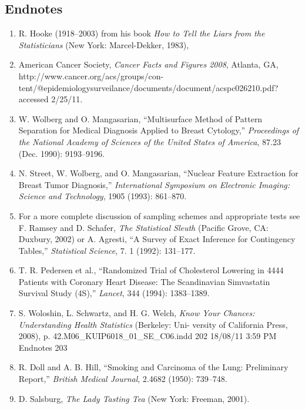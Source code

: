 \documentclass[
]{book}
\begin{document}
\begin{enumerate}
\end{enumerate}

\hypertarget{endnotes-3}{%
\subsection*{Endnotes}\label{endnotes-3}}

\begin{enumerate}

\item R. Hooke (1918–2003) from his book \textit{How to Tell the Liars from the Statisticians} (New York: Marcel-Dekker, 1983),
\item American Cancer Society, \textit{Cancer Facts and Figures 2008}, Atlanta, GA, http://www.cancer.org/acs/groups/con-
tent/@epidemiologysurveilance/documents/document/acspc026210.pdf? accessed 2/25/11.
\item W. Wolberg and O. Mangasarian, “Multisurface Method of Pattern Separation for Medical Diagnosis Applied to
Breast Cytology,” \textit{Proceedings of the National Academy of Sciences of the United States of America}, 87.23 (Dec.
1990): 9193–9196.
\item N. Street, W. Wolberg, and O. Mangasarian, “Nuclear Feature Extraction for Breast Tumor Diagnosis,” \textit{International
Symposium on Electronic Imaging: Science and Technology}, 1905 (1993): 861–870.
\item For a more complete discussion of sampling schemes and appropriate tests see F. Ramsey and D. Schafer, \textit{The
Statistical Sleuth} (Pacific Grove, CA: Duxbury, 2002) or A. Agresti, “A Survey of Exact Inference for Contingency
Tables,” \textit{Statistical Science}, 7. 1 (1992): 131–177.
\item T. R. Pedersen et al., “Randomized Trial of Cholesterol Lowering in 4444 Patients with Coronary Heart Disease:
The Scandinavian Simvastatin Survival Study (4S),” \textit{Lancet}, 344 (1994): 1383–1389.
\item S. Woloshin, L. Schwartz, and H. G. Welch, \textit{Know Your Chances: Understanding Health Statistics} (Berkeley: Uni-
versity of California Press, 2008), p. 42.M06\_KUIP6018\_01\_SE\_C06.indd 202 18/08/11 3:59 PM Endnotes 203
\item R. Doll and A. B. Hill, “Smoking and Carcinoma of the Lung: Preliminary Report,” \textit{British Medical Journal}, 2.4682
(1950): 739–748.
\item D. Salsburg, \textit{The Lady Tasting Tea} (New York: Freeman, 2001).

\end{enumerate}
\end{document}
